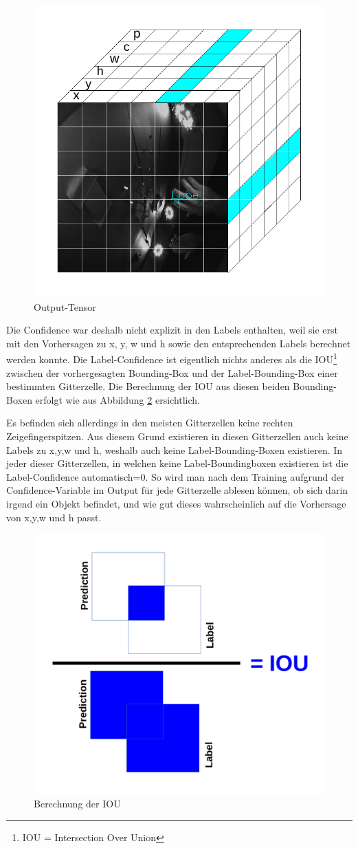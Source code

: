 \begin{figure}	
	\centering
	\includegraphics[width=.7\textwidth]{Kapitel/50Kostenfunktion/Bilder/PredictionTensor.pdf}
	\caption{Output-Tensor}
	\label{img:output_tensor}
\end{figure} 

Die Confidence war deshalb nicht explizit in den Labels enthalten, weil sie erst mit den Vorhersagen zu x, y, w und h sowie den entsprechenden Labels berechnet werden konnte.
Die Label-Confidence ist eigentlich nichts anderes als die IOU\footnote{\label{foot:1}IOU = Intersection Over Union} zwischen der vorhergesagten Bounding-Box und der Label-Bounding-Box einer bestimmten Gitterzelle. 
Die Berechnung der IOU aus diesen beiden Bounding-Boxen erfolgt wie aus Abbildung \ref{img:IOU} ersichtlich.

Es befinden sich allerdings in den meisten Gitterzellen keine rechten Zeigefingerspitzen. 
Aus diesem Grund existieren in diesen Gitterzellen auch keine Labels zu x,y,w und h, weshalb auch keine Label-Bounding-Boxen existieren.
In jeder dieser Gitterzellen, in welchen keine Label-Boundingboxen existieren ist die Label-Confidence automatisch=0. 
So wird man nach dem Training aufgrund der Confidence-Variable im Output für jede Gitterzelle ablesen können, ob sich darin irgend ein Objekt befindet, und wie gut dieses wahrscheinlich auf die Vorhersage von x,y,w und h passt.


\begin{figure}	
	\centering
	\includegraphics[width=.4\textwidth]{Kapitel/50Kostenfunktion/Bilder/IOU.pdf}
	\caption{Berechnung der IOU}
	\label{img:IOU}
\end{figure} 


